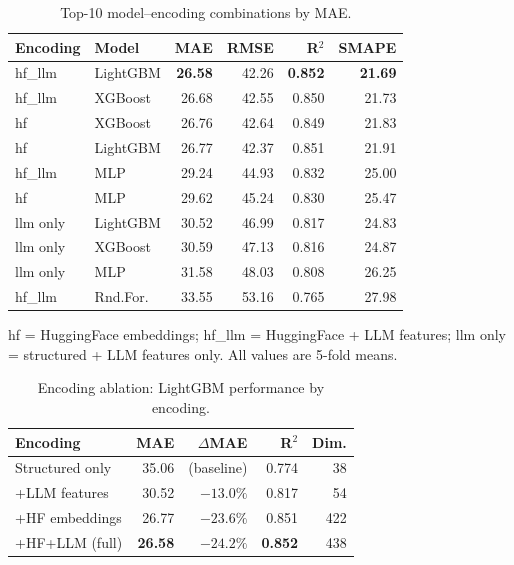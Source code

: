 \documentclass[11pt,twocolumn]{article}
\newcommand{\bestval}[1]{{\color{bestcol}\textbf{#1}}}
\begin{document}
\begin{table}[H]
\centering
\caption{Top-10 model--encoding combinations by MAE.}
\label{tab:top10}
\small
\begin{tabular}{llrrrr}
\toprule
\textbf{Encoding} & \textbf{Model} & \textbf{MAE} & \textbf{RMSE} & \textbf{R$^2$} & \textbf{SMAPE} \\
\midrule
hf\_llm  & LightGBM & \bestval{26.58} & 42.26 & \bestval{0.852} & \bestval{21.69} \\
hf\_llm  & XGBoost  & 26.68 & 42.55 & 0.850 & 21.73 \\
hf       & XGBoost  & 26.76 & 42.64 & 0.849 & 21.83 \\
hf       & LightGBM & 26.77 & 42.37 & 0.851 & 21.91 \\
hf\_llm  & MLP      & 29.24 & 44.93 & 0.832 & 25.00 \\
hf       & MLP      & 29.62 & 45.24 & 0.830 & 25.47 \\
llm only & LightGBM & 30.52 & 46.99 & 0.817 & 24.83 \\
llm only & XGBoost  & 30.59 & 47.13 & 0.816 & 24.87 \\
llm only & MLP      & 31.58 & 48.03 & 0.808 & 26.25 \\
hf\_llm  & Rnd.For. & 33.55 & 53.16 & 0.765 & 27.98 \\
\bottomrule
\end{tabular}
\begin{tablenotes}
  \footnotesize
  \item hf = HuggingFace embeddings; hf\_llm = HuggingFace + LLM features;
        llm only = structured + LLM features only.
        All values are 5-fold means.
\end{tablenotes}
\end{table}

\begin{table}[H]
\centering
\caption{Encoding ablation: LightGBM performance by encoding.}
\label{tab:ablation}
\small
\begin{tabular}{lrrrr}
\toprule
\textbf{Encoding} & \textbf{MAE} & $\Delta$\textbf{MAE} & \textbf{R$^2$} & \textbf{Dim.} \\
\midrule
Structured only    & 35.06 & (baseline) & 0.774 &  38 \\
+LLM features      & 30.52 & $-13.0\%$ & 0.817 &  54 \\
+HF embeddings     & 26.77 & $-23.6\%$ & 0.851 & 422 \\
+HF+LLM (full)     & \bestval{26.58} & $\mathbf{-24.2\%}$ & \bestval{0.852} & 438 \\
\bottomrule
\end{tabular}
\end{table}
\end{document}
